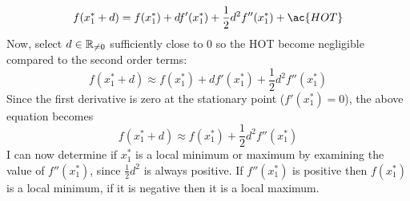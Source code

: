     \[f(x^{*}_{1} + d) = f(x^{*}_{1}) + df'(x^{*}_{1}) + \frac{1}{2}d^2f''(x^{*}_{1}) + \ac{HOT}\]
    Now, select \(d \in \mathbb{R}_{\ne 0}\) sufficiently close to 0 so the \acl{HOT} become negligible compared to the second order terms:
    \[f(x^{*}_{1} + d) \approx f(x^{*}_{1}) + df'(x^{*}_{1}) + \frac{1}{2}d^2f''(x^{*}_{1})\]
    Since the first derivative is zero at the stationary point (\(f'(x^{*}_{1}) = 0\)), the above equation becomes
    \[f(x^{*}_{1} + d) \approx f(x^{*}_{1}) + \frac{1}{2}d^2f''(x^{*}_{1})\]
    I can now determine if \(x^{*}_{1}\) is a local minimum or maximum by examining the value of \(f''(x^{*}_{1})\), since \(\frac{1}{2}d^2\) is always positive. If \(f''(x^{*}_{1})\) is positive then \(f(x^{*}_{1})\) is a local minimum, if it is negative then it is a local maximum.